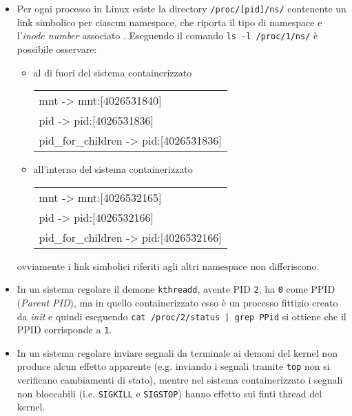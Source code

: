 \documentclass{article}
\begin{document}
\begin{itemize}
	\item Per ogni processo in Linux esiste la directory \texttt{/proc/[pid]/ns/} contenente un link simbolico per ciascun namespace, che riporta il tipo di namespace e l'\textsl{inode number} associato \cite{man namespaces}. Eseguendo il comando \texttt{ls -l /proc/1/ns/} è possibile osservare:
	\begin{itemize}
		\item al di fuori del sistema containerizzato
		\begin{center}
			{\ttfamily
				\begin{tabular}{l}
					mnt -> mnt:[4026531840] \\
					pid -> pid:[4026531836] \\
					pid\_for\_children -> pid:[4026531836]
				\end{tabular}
			}
		\end{center}
		
		\item all'interno del sistema containerizzato
		\begin{center}
			{\ttfamily
				\begin{tabular}{l}
					mnt -> mnt:[4026532165] \\
					pid -> pid:[4026532166] \\
					pid\_for\_children -> pid:[4026532166]
				\end{tabular}
			}
		\end{center}
	\end{itemize}
	ovviamente i link simbolici riferiti agli altri namespace non differiscono.
	
	\item In un sistema regolare il demone \texttt{kthreadd}, avente PID \texttt{2}, ha \texttt{0} come PPID (\textsl{Parent PID}), ma in quello containerizzato esso è un processo fittizio creato da \textsl{init} e quindi eseguendo \texttt{cat /proc/2/status | grep PPid} si ottiene che il PPID corrisponde a \texttt{1}.
	
	\item In un sistema regolare inviare segnali da terminale ai demoni del kernel non produce alcun effetto apparente (e.g. inviando i segnali tramite \texttt{top} non si verificano cambiamenti di stato), mentre nel sistema containerizzato i segnali non bloccabili (i.e. \texttt{SIGKILL} e \texttt{SIGSTOP}) hanno effetto sui finti thread del kernel.
\end{itemize}
\end{document}
